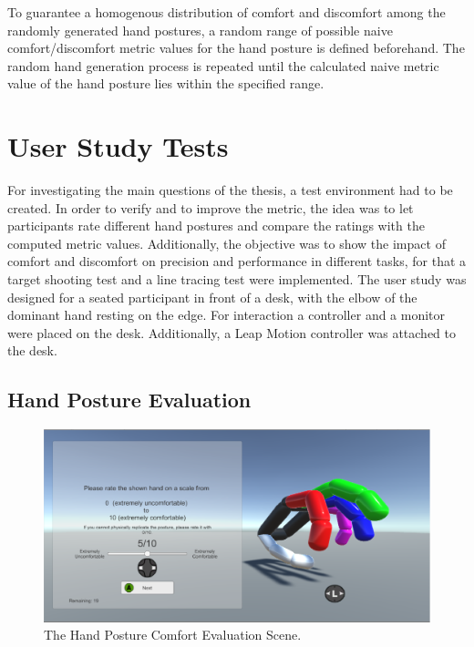 To guarantee a homogenous distribution of comfort and discomfort among the randomly generated hand postures, a random range of possible naive comfort/discomfort metric values for the hand posture is defined beforehand. The random hand generation process is repeated until the calculated naive metric value of the hand posture lies within the specified range.

\section{User Study Tests}

For investigating the main questions of the thesis, a test environment had to be created. In order to verify and to improve the metric, the idea was to let participants rate different hand postures and compare the ratings with the computed metric values. Additionally, the objective was to show the impact of comfort and discomfort on precision and performance in different tasks, for that a target shooting test and a line tracing test were implemented.
The user study was designed for a seated participant in front of a desk, with the elbow of the dominant hand resting on the edge. For interaction a controller and a monitor were placed on the desk. Additionally, a Leap Motion controller was attached to the desk.  

\subsection{Hand Posture Evaluation}


\begin{figure}
\centering
\includegraphics[width=\textwidth]{evaluation}
\caption{The Hand Posture Comfort Evaluation Scene.}
\label{fig:evaluation}
\end{figure}

